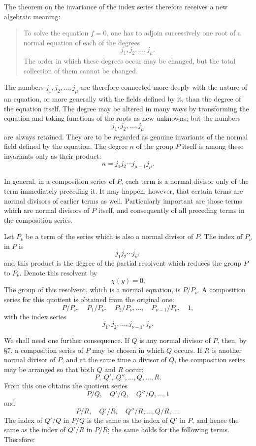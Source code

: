 \documentclass[11pt,a4paper]{book}
\begin{document}
The theorem on the invariance of the index series therefore receives a new algebraic meaning:

\begin{quote}
To solve the equation \(f=0\), one has to adjoin successively one root of a normal equation of each of the degrees
\[
 j_1,j_2,\ldots,j_\mu .
\]
The order in which these degrees occur may be changed, but the total collection of them cannot be changed.
\end{quote}

The numbers \(j_1,j_2,\ldots,j_\mu\) are therefore connected more deeply with the nature of an equation, or more generally with the fields defined by it, than the degree of the equation itself.  The degree may be altered in many ways by transforming the equation and taking functions of the roots as new unknowns; but the numbers
\[
 j_1,j_2,\ldots,j_\mu
\]
are always retained.  They are to be regarded as genuine invariants of the normal field defined by the equation.  The degree \(n\) of the group \(P\) itself is among these invariants only as their product:
\[
 n=j_1j_2\cdots j_{\mu-1}j_\mu .
\]

In general, in a composition series of \(P\), each term is a normal divisor only of the term immediately preceding it.  It may happen, however, that certain terms are normal divisors of earlier terms as well.  Particularly important are those terms which are normal divisors of \(P\) itself, and consequently of all preceding terms in the composition series.

Let \(P_\nu\) be a term of the series which is also a normal divisor of \(P\).  The index of \(P_\nu\) in \(P\) is
\[
 j_1j_2\cdots j_\nu,
\]
and this product is the degree of the partial resolvent which reduces the group \(P\) to \(P_\nu\).  Denote this resolvent by
\[
 \chi(y)=0.
\]
The group of this resolvent, which is a normal equation, is \(P/P_\nu\).  A composition series for this quotient is obtained from the original one:
\[
 P/P_\nu,\quad P_1/P_\nu,\quad P_2/P_\nu,\ldots,\quad
 P_{\nu-1}/P_\nu,\quad 1,
\]
with the index series
\[
 j_1,j_2,\ldots,j_{\nu-1},j_\nu .
\]

We shall need one further consequence.  If \(Q\) is any normal divisor of \(P\), then, by \S 7, a composition series of \(P\) may be chosen in which \(Q\) occurs.  If \(R\) is another normal divisor of \(P\), and at the same time a divisor of \(Q\), the composition series may be arranged so that both \(Q\) and \(R\) occur:
\[
 P,\ Q',\ Q'',\ldots,Q,\ldots,R .
\]
From this one obtains the quotient series
\[
 P/Q,\quad Q'/Q,\quad Q''/Q,\ldots,1
\]
and
\[
 P/R,\quad Q'/R,\quad Q''/R,\ldots,Q/R,\ldots .
\]
The index of \(Q'/Q\) in \(P/Q\) is the same as the index of \(Q'\) in \(P\), and hence the same as the index of \(Q'/R\) in \(P/R\); the same holds for the following terms.  Therefore:
\end{document}
